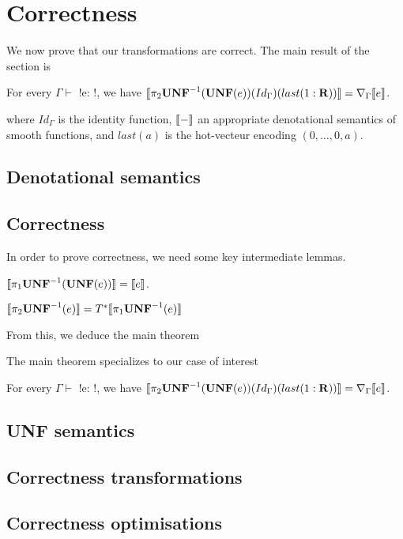 \section{Correctness}
\label{sec:correctness}

We now prove that our transformations are correct. 
 The main result of the section is

 \begin{theorem}
     For every $\Gamma \vdash$ !e: \reals!, we have 
     $\llbracket \pi_2 \mathbf{UNF}^{-1}(\mathbf{UNF}(e))(Id_\Gamma)(last(1:\mathbf{R}))\rrbracket= \nabla_{\Gamma}\llbracket e\rrbracket$.
 \end{theorem}
 where $Id_\Gamma$ is the identity function, 
 $\llbracket -\rrbracket$ an appropriate denotational semantics of smooth functions,
 and $last(a)$ is the hot-vecteur encoding $(0,\ldots,0,a)$. 

\subsection{Denotational semantics} 

\subsection{Correctness} 

 In order to prove correctness, we need some key intermediate lemmas.

 \begin{lemma}
     $\llbracket \pi_1\mathbf{UNF}^{-1}(\mathbf{UNF}(e))\rrbracket=\llbracket e\rrbracket$.
 \end{lemma}

 \begin{lemma}
     $\llbracket \pi_2\mathbf{UNF}^{-1}(e)\rrbracket=T^*\llbracket \pi_1\mathbf{UNF}^{-1}(e)\rrbracket$
 \end{lemma}

 From this, we deduce the main theorem

 \begin{theorem}
 \end{theorem}

 The main theorem specializes to our case of interest

 \begin{corollary}
     For every $\Gamma \vdash$ !e: \reals!, we have 
     $\llbracket \pi_2 \mathbf{UNF}^{-1}(\mathbf{UNF}(e))(Id_\Gamma)(last(1:\mathbf{R}))\rrbracket= \nabla_{\Gamma}\llbracket e\rrbracket$.
 \end{corollary}

 \subsection{UNF semantics} %
 \label{sub:UNF semantics}
 

 \subsection{Correctness transformations} %
 \label{sub:Correctness transformations}


 \subsection{Correctness optimisations} %
 \label{sub:Correctness optimisations}
 
